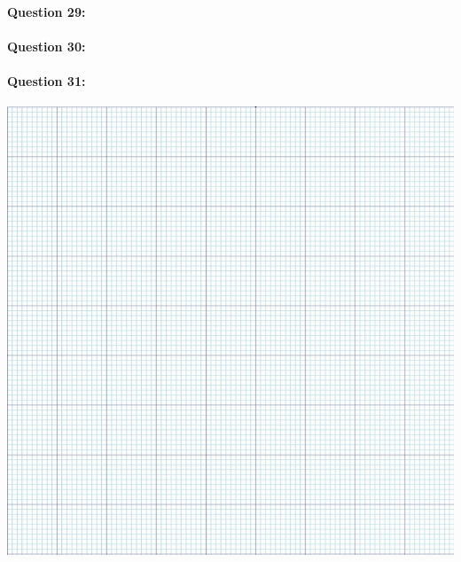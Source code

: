 \reponse[3]

\paragraph{Question 29:}

\reponse[3]

\paragraph{Question 30:}

\reponse[3]

\paragraph{Question 31:}

\begin{center}
\begin{minipage}{0.49\linewidth}
	\includegraphics[width=\linewidth]{img/rep4}
\end{minipage}\hfill
\begin{minipage}{0.49\linewidth}

\end{minipage}
\end{center}
